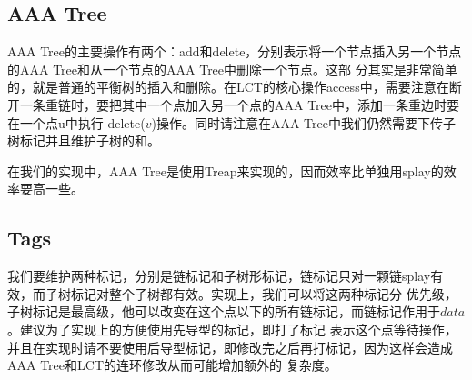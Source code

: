 ﻿\documentclass{article}
\begin{document}
		\subsection{AAA Tree}
		\indent AAA Tree的主要操作有两个：add和delete，分别表示将一个节点插入另一个节点的AAA Tree和从一个节点的AAA Tree中删除一个节点。这部
		分其实是非常简单的，就是普通的平衡树的插入和删除。在LCT的核心操作access中，需要注意在断开一条重链时，要把其中一个点加入另一个点的AAA Tree中，添加一条重边时要在一个点u中执行
		delete($v$)操作。同时请注意在AAA Tree中我们仍然需要下传子树标记并且维护子树的和。\par
		\indent 在我们的实现中，AAA Tree是使用Treap来实现的，因而效率比单独用splay的效率要高一些。
		\subsection{Tags}
			我们要维护两种标记，分别是链标记和子树形标记，链标记只对一颗链splay有效，而子树标记对整个子树都有效。实现上，我们可以将这两种标记分
			优先级，子树标记是最高级，他可以改变在这个点以下的所有链标记，而链标记作用于$data$。建议为了实现上的方便使用先导型的标记，即打了标记
			表示这个点等待操作，并且在实现时请不要使用后导型标记，即修改完之后再打标记，因为这样会造成AAA Tree和LCT的连环修改从而可能增加额外的
			复杂度。
\end{document}
